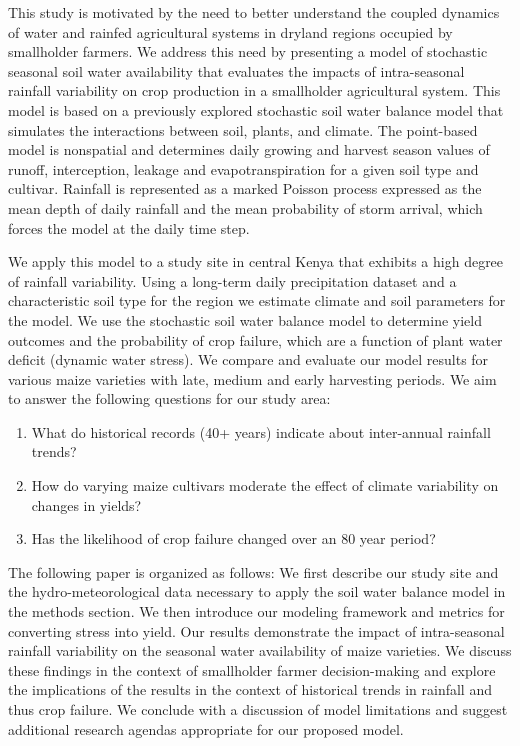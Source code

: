 This study is motivated by the need to better understand the coupled dynamics of water and rainfed agricultural systems in dryland regions occupied by smallholder farmers. We address this need by presenting a model of stochastic seasonal soil water availability that evaluates the impacts of intra-seasonal rainfall variability on crop production in a smallholder agricultural system. This model is based on a previously explored stochastic soil water balance model \cite{laio2001plants, Laio2001-vb, Rodriguez-Iturbe2001-un, Porporato2001-ui} that simulates the interactions between soil, plants, and climate. The point-based model is nonspatial and determines daily growing and harvest season values of runoff, interception, leakage and evapotranspiration for a given soil type and cultivar. Rainfall is represented as a marked Poisson process expressed as the mean depth of daily rainfall and the mean probability of storm arrival, which forces the model at the daily time step.

We apply this model to a study site in central Kenya that exhibits a high degree of rainfall variability. Using a long-term daily precipitation dataset and a characteristic soil type for the region we estimate climate and soil parameters for the model. We use the stochastic soil water balance model to determine yield outcomes and the probability of crop failure, which are a function of plant water deficit (dynamic water stress). We compare and evaluate our model results for various maize varieties with late, medium and early harvesting periods. We aim to answer the following questions for our study area:
\begin{enumerate}
\item What do historical records (40+ years) indicate about inter-annual rainfall trends? 
\item How do varying maize cultivars moderate the effect of climate variability on changes in yields?
\item Has the likelihood of crop failure changed over an 80 year period?
\end{enumerate}

The following paper is organized as follows: We first describe our study site and the hydro-meteorological data necessary to apply the soil water balance model in the methods section. We then introduce our modeling framework and metrics for converting stress into yield. Our results demonstrate the impact of intra-seasonal rainfall variability on the seasonal water availability of maize varieties. We discuss these findings in the context of smallholder farmer decision-making and explore the implications of the results in the context of historical trends in rainfall and thus crop failure. We conclude with a discussion of model limitations and suggest additional research agendas appropriate for our proposed model.